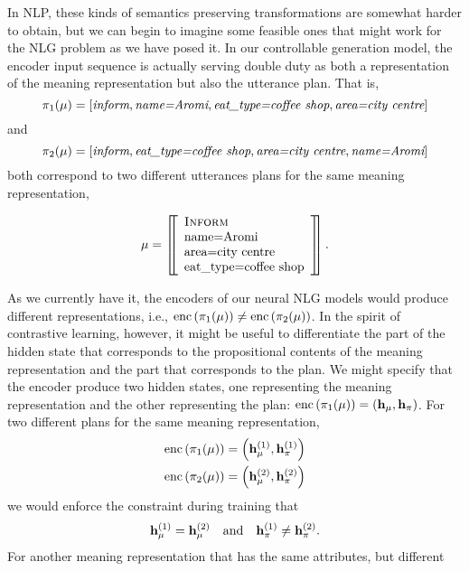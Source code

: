 In NLP, these kinds of semantics preserving transformations are somewhat harder
to obtain, but we can begin to imagine some feasible ones that might work for
the NLG problem as we have posed it. In our controllable generation model, the
encoder input sequence is actually serving double duty as both a representation
of the meaning representation but also the utterance plan. That is, 
\[ 
    \pi_1(\mu) = \left[
    \textit{inform}, \textit{name=Aromi}, \textit{eat\_type=coffee shop}, 
    \textit{area=city centre} \right] 
\] 
and
\[
    \pi_2(\mu) = \left[
        \textit{inform}, \textit{eat\_type=coffee shop}, 
    \textit{area=city centre}, \textit{name=Aromi} \right]
\]
both correspond to two different utterances plans for the same meaning
representation,\begin{singlespace}\[
    \mu = \left[\!\!\left[  \begin{array}{l} \textsc{Inform} \\ \textrm{name=Aromi} \\ \textrm{area=city centre} \\ \textrm{eat\_type=coffee shop} \end{array} \right]\!\!\right].
\]\end{singlespace}
\noindent As we currently have it, the encoders of our neural NLG models would
produce different representations, i.e.,
$\operatorname{enc}\left(\pi_1(\mu)\right) \ne
\operatorname{enc}\left(\pi_2(\mu)\right)$. In the spirit of contrastive
learning, however, it might be useful to differentiate the part of the hidden
state that corresponds to the propositional contents of the  meaning
representation and the part that corresponds to the plan. We might specify that
the encoder produce two hidden states, one representing the meaning
representation and the other representing the plan:
$\operatorname{enc}\left(\pi_1(\mu)\right) = \left(\mathbf{h}_{\mu},
\mathbf{h}_{\pi}\right)$. For two different plans for the same meaning
representation,  \begin{align*}
    \operatorname{enc}\left(\pi_1(\mu)\right) &= \left(\mathbf{h}^{(1)}_{\mu}, \mathbf{h}^{(1)}_{\pi}\right)\\
    \operatorname{enc}\left(\pi_2(\mu)\right) &= \left(\mathbf{h}^{(2)}_{\mu}, \mathbf{h}^{(2)}_{\pi}\right)\\
\end{align*}
we would enforce the constraint during training that
\[ \mathbf{h}^{(1)}_{\mu} = \mathbf{h}^{(2)}_{\mu} \quad \textrm{and} \quad
\mathbf{h}^{(1)}_{\pi} \ne  \mathbf{h}^{(2)}_{\pi}. \]
For another meaning representation that has the same attributes, but different
